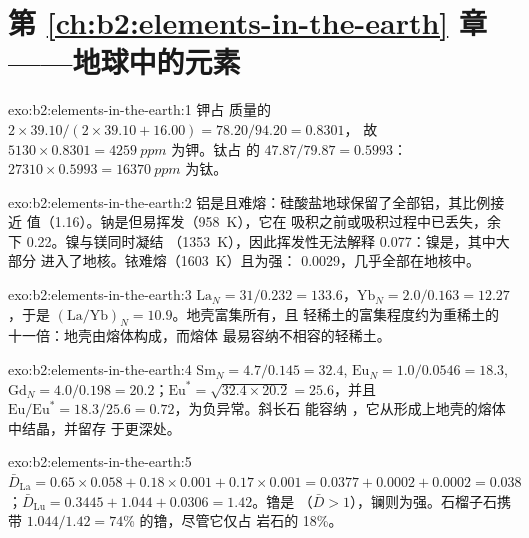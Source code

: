\section*{第 \ref{ch:b2:elements-in-the-earth} 章——地球中的元素}

\begin{solution}{exo:b2:elements-in-the-earth:1}
钾占  质量的 $2\times39.10/(2\times39.10+16.00) = 78.20/94.20 = 0.8301$，
故 $\num{5130}\times0.8301 = \qty{4259}{ppm}$ 为钾。钛占
 的 $47.87/79.87 = 0.5993$：$\num{27310}\times0.5993 = \qty{16370}{ppm}$ 为钛。
\end{solution}

\begin{solution}{exo:b2:elements-in-the-earth:2}
铝是且难熔：硅酸盐地球保留了全部铝，其比例接近
值（1.16）。钠是但易挥发（\qty{958}{K}），它在
吸积之前或吸积过程中已丢失，余下 0.22。镍与镁同时凝结
（\qty{1353}{K}），因此挥发性无法解释 0.077：镍是，其中大部分
进入了地核。铱难熔（\qty{1603}{K}）且为强：
0.0029，几乎全部在地核中。
\end{solution}

\begin{solution}{exo:b2:elements-in-the-earth:3}
$\mathrm{La}_N = 31/0.232 = 133.6$，$\mathrm{Yb}_N = 2.0/0.163 = 12.27$，于是
$(\mathrm{La}/\mathrm{Yb})_N = 10.9$。地壳富集所有，且
轻稀土的富集程度约为重稀土的十一倍：地壳由熔体构成，而熔体
最易容纳不相容的轻稀土。
\end{solution}

\begin{solution}{exo:b2:elements-in-the-earth:4}
$\mathrm{Sm}_N = 4.7/0.145 = 32.4$, $\mathrm{Eu}_N = 1.0/0.0546 = 18.3$,
$\mathrm{Gd}_N = 4.0/0.198 = 20.2$；$\mathrm{Eu}^* = \sqrt{32.4\times20.2} = 25.6$，并且
$\mathrm{Eu}/\mathrm{Eu}^* = 18.3/25.6 = 0.72$，为负异常。斜长石
能容纳 ，它从形成上地壳的熔体中结晶，并留存
于更深处。
\end{solution}

\begin{solution}{exo:b2:elements-in-the-earth:5}
$\bar D_{\mathrm{La}} = 0.65\times0.058+0.18\times0.001+0.17\times0.001 = 0.0377 +
0.0002 + 0.0002 = 0.038$；$\bar D_{\mathrm{Lu}} = 0.3445+1.044+0.0306 = 1.42$。镥是
（$\bar D > 1$），镧则为强。石榴子石携带
$1.044/1.42 = 74$\% 的镥，尽管它仅占
岩石的 18\%。
\end{solution}

